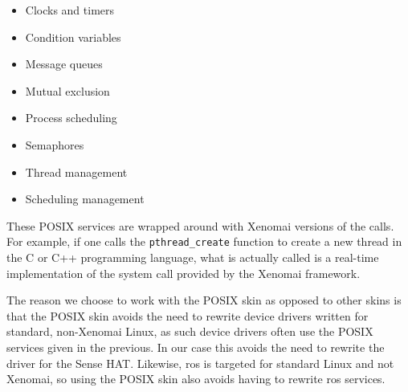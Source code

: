 \documentclass[12pt]{scrreprt}
\begin{document}
\begin{itemize}
    \item Clocks and timers
    \item Condition variables
    \item Message queues
    \item Mutual exclusion 
    \item Process scheduling 
    \item Semaphores
    \item Thread management
    \item Scheduling management
\end{itemize}

These POSIX services are wrapped around with Xenomai versions of the calls. For example, if one calls the \texttt{pthread_create} function to create a new thread in the C or C++ programming language, what is actually called is a real-time implementation of the system call provided by the Xenomai framework.
\par
The reason we choose to work with the POSIX skin as opposed to other skins is that the POSIX skin avoids the need to rewrite device drivers written for standard, non-Xenomai Linux, as such device drivers often use the POSIX services given in the previous. In our case this avoids the need to rewrite the driver for the Sense HAT. Likewise, \acrshort{ros} is targeted for standard Linux and not Xenomai, so using the POSIX skin also avoids having to rewrite \acrshort{ros} services.


%


%
\end{document}
